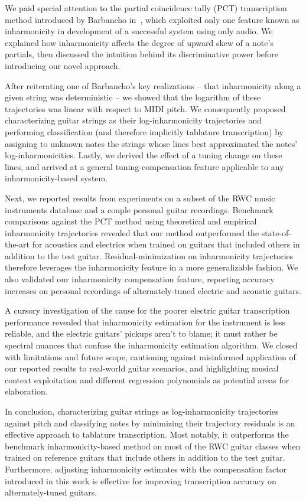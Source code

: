 \documentclass[12pt]{cmuthesis}
\begin{document}
We paid special attention to the partial coincidence tally (PCT) transcription method introduced by Barbancho in~\cite{barbanchoi2012}, which exploited only one feature known as inharmonicity in development of a successful system using only audio. We explained how inharmonicity affects the degree of upward skew of a note's partials, then discussed the intuition behind its discriminative power before introducing our novel approach.

After reiterating one of Barbancho's key realizations -- that inharmonicity along a given string was deterministic -- we showed that the logarithm of these trajectories was linear with respect to MIDI pitch. We consequently proposed characterizing guitar strings as their log-inharmonicity trajectories and performing classification (and therefore implicitly tablature transcription) by assigning to unknown notes the strings whose lines best approximated the notes' log-inharmonicities. Lastly, we derived the effect of a tuning change on these lines, and arrived at a general tuning-compensation feature applicable to any inharmonicity-based system.

Next, we reported results from experiments on a subset of the RWC music instruments database and a couple personal guitar recordings. Benchmark comparisons against the PCT method using theoretical and empirical inharmonicity trajectories revealed that our method outperformed the state-of-the-art for acoustics and electrics when trained on guitars that included others in addition to the test guitar. Residual-minimization on inharmonicity trajectories therefore leverages the inharmonicity feature in a more generalizable fashion. We also validated our inharmonicity compensation feature, reporting accuracy increases on personal recordings of alternately-tuned electric and acoustic guitars.

A cursory investigation of the cause for the poorer electric guitar transcription performance revealed that inharmonicity estimation for the instrument is less reliable, and the electric guitars' pickups aren't to blame; it must rather be spectral nuances that confuse the inharmonicity estimation algorithm. We closed with limitations and future scope, cautioning against misinformed application of our reported results to real-world guitar scenarios, and highlighting musical context exploitation and different regression polynomials as potential areas for elaboration.

In conclusion, characterizing guitar strings as log-inharmonicity trajectories against pitch and classifying notes by minimizing their trajectory residuals is an effective approach to tablature transcription. Most notably, it outperforms the benchmark inharmonicity-based method on most of the RWC guitar classes when trained on reference guitars that include others in addition to the test guitar. Furthermore, adjusting inharmonicity estimates with the compensation factor introduced in this work is effective for improving transcription accuracy on alternately-tuned guitars.
\end{document}
